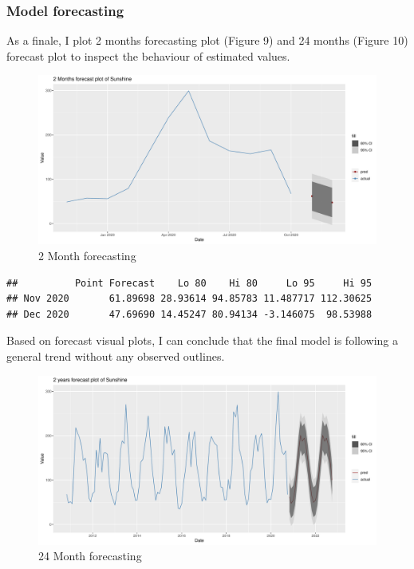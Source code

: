 \documentclass[
  11pt,
]{article}
\begin{document}
\newpage

\hypertarget{model-forecasting}{%
\subsubsection{Model forecasting}\label{model-forecasting}}

As a finale, I plot 2 months forecasting plot (Figure 9) and 24 months
(Figure 10) forecast plot to inspect the behaviour of estimated values.

\begin{figure}
\centering
\includegraphics{ST422_files/figure-latex/unnamed-chunk-16-1.pdf}
\caption{2 Month forecasting}
\end{figure}

\begin{verbatim}
##          Point Forecast    Lo 80    Hi 80     Lo 95     Hi 95
## Nov 2020       61.89698 28.93614 94.85783 11.487717 112.30625
## Dec 2020       47.69690 14.45247 80.94134 -3.146075  98.53988
\end{verbatim}

Based on forecast visual plots, I can conclude that the final model is
following a general trend without any observed outlines.

\begin{figure}
\centering
\includegraphics{ST422_files/figure-latex/unnamed-chunk-17-1.pdf}
\caption{24 Month forecasting}
\end{figure}
\end{document}
